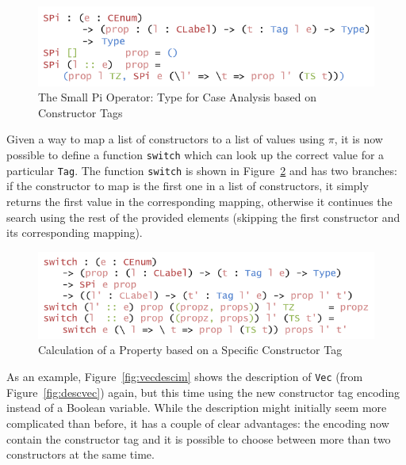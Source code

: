 \documentclass{ituthesis}
\newcommand{\tttype}[1]{\textcolor{type-color}{\texttt{#1}}}
\newcommand{\ttdec}[1]{\textcolor{declared-var-color}{\texttt{#1}}}
\theoremstyle{definition}
\begin{document}
\begin{figure}[ht]
\begin{center}
    \includegraphics[scale=0.5]{Figures/AConstructiveTypeofChoice.png}
\end{center}
\caption{The Small Pi Operator: Type for Case Analysis based on Constructor Tags}
\label{fig:smallpiop}
\end{figure}

Given a way to map a list of constructors to a list of values using $\pi$, it is now possible to define a function \ttdec{switch} which can look up the correct value for a particular \tttype{Tag}.
The function \ttdec{switch} is shown in Figure~\ref{fig:switchctor} and has two branches: if the constructor to map is the first one in a list of constructors, it simply returns the first value in the corresponding mapping, otherwise
it continues the search using the rest of the provided elements (skipping the first constructor and its corresponding mapping).

\begin{figure}[ht]
\begin{center}
    \includegraphics[scale=0.5]{Figures/AConstructiveChoice.png}
\end{center}
\caption{Calculation of a Property based on a Specific Constructor Tag}
\label{fig:switchctor}
\end{figure}

As an example, Figure~\ref{fig:vecdescim} shows the description of \tttype{Vec} (from Figure~\ref{fig:descvec}) again, but this time using the new constructor tag encoding instead of a Boolean variable.
While the description might initially seem more complicated than before, it has a couple of clear advantages: the encoding now contain the constructor tag and it is possible to choose between more than two constructors at the same time.
\end{document}
